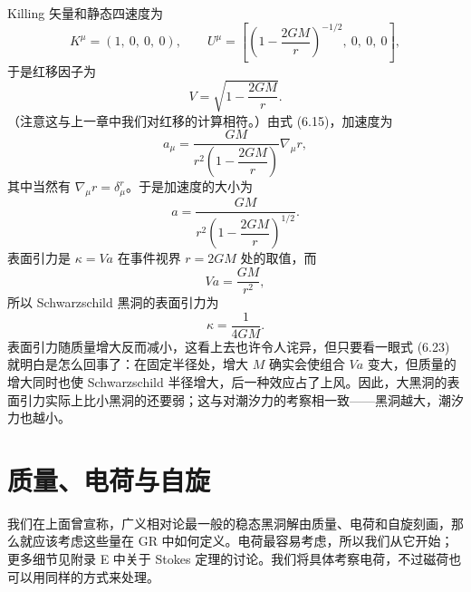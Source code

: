 Killing 矢量和静态四速度为
\begin{equation*}
K^\mu = (1,\ 0,\ 0,\ 0), \qquad U^\mu = \left[\left(1-\frac{2GM}{r}\right)^{-1/2},\ 0,\ 0,\ 0\right],
\tag{6.19}
\end{equation*}
于是红移因子为
\begin{equation*}
V = \sqrt{1-\frac{2GM}{r}}.
\tag{6.20}
\end{equation*}
（注意这与上一章中我们对红移的计算相符。）由式 (6.15)，加速度为
\begin{equation*}
a_\mu = \frac{GM}{r^{2}\left(1-\dfrac{2GM}{r}\right)}\nabla_\mu r,
\tag{6.21}
\end{equation*}
其中当然有 $\nabla_\mu r=\delta^{r}_{\mu}$。于是加速度的大小为
\begin{equation*}
a = \frac{GM}{r^{2}\left(1-\dfrac{2GM}{r}\right)^{1/2}}.
\tag{6.22}
\end{equation*}
表面引力是 $\kappa=Va$ 在事件视界 $r=2GM$ 处的取值，而
\begin{equation*}
Va = \frac{GM}{r^{2}},
\tag{6.23}
\end{equation*}
所以 Schwarzschild 黑洞的表面引力为
\begin{equation*}
\kappa = \frac{1}{4GM}.
\tag{6.24}
\end{equation*}
表面引力随质量增大反而减小，这看上去也许令人诧异，但只要看一眼式 (6.23) 就明白是怎么回事了：在固定半径处，增大 $M$ 确实会使组合 $Va$ 变大，但质量的增大同时也使 Schwarzschild 半径增大，后一种效应占了上风。因此，大黑洞的表面引力实际上比小黑洞的还要弱；这与对潮汐力的考察相一致——黑洞越大，潮汐力也越小。

\section{质量、电荷与自旋}

我们在上面曾宣称，广义相对论最一般的稳态黑洞解由质量、电荷和自旋刻画，那么就应该考虑这些量在 GR 中如何定义。电荷最容易考虑，所以我们从它开始；更多细节见附录 E 中关于 Stokes 定理的讨论。我们将具体考察电荷，不过磁荷也可以用同样的方式来处理。

